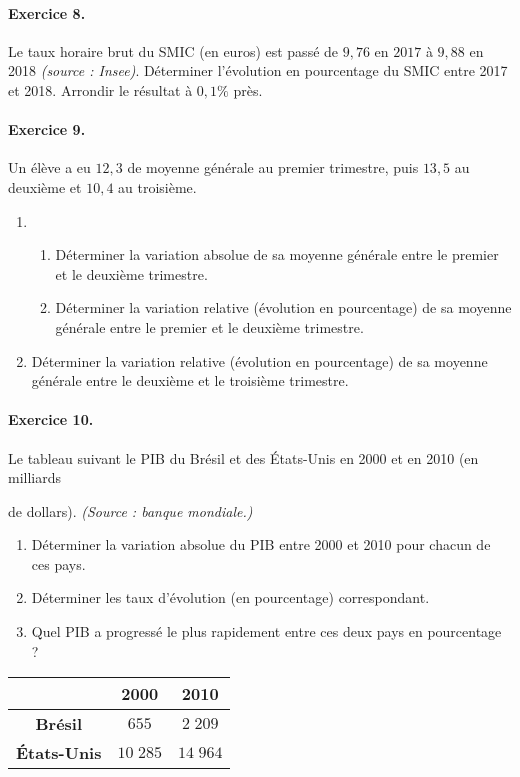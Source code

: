 \documentclass[11pt]{article}
\begin{document}
\paragraph{Exercice 8.}
Le taux horaire brut du SMIC (en euros) est passé de $9,76$ en $2017$ à $9,88$
en 2018 \emph{(source : Insee)}. Déterminer l'évolution en pourcentage du SMIC
entre 2017 et 2018. Arrondir le résultat à $0,1\%$ près.

\paragraph{Exercice 9.} Un élève a eu $12,3$ de moyenne générale au premier
trimestre, puis $13,5$ au deuxième et $10,4$ au troisième.
\begin{enumerate}
  \item \begin{enumerate}
      \item Déterminer la variation absolue de sa moyenne générale entre le
        premier et le deuxième trimestre.
      \item Déterminer la variation relative (évolution en pourcentage) de sa
        moyenne générale entre le premier et le deuxième trimestre.
    \end{enumerate}
      \item Déterminer la variation relative (évolution en pourcentage) de sa
        moyenne générale entre le deuxième et le troisième trimestre.
\end{enumerate}

\paragraph{Exercice 10.}
Le tableau suivant le PIB du Brésil et des États-Unis en 2000 et en 2010 (en
milliards\\
\begin{minipage}{.7\textwidth}
  de dollars). \emph{(Source : banque mondiale.)}
  \begin{enumerate}
    \item Déterminer la variation absolue du PIB entre 2000 et 2010 pour chacun
      de ces pays.
    \item Déterminer les taux d'évolution (en pourcentage) correspondant.
    \item Quel PIB a progressé le plus rapidement entre ces deux pays en
      pourcentage ?
  \end{enumerate}
\end{minipage}
\begin{minipage}{.3\textwidth}
  \begin{tabular}{ccc}
    \toprule
    & \textbf{2000} & \textbf{2010} \\
    \midrule
    \textbf{Brésil} & $ 655$ & $2\;209$ \\
    \textbf{États-Unis} & $10\;285$ & $14\;964$\\
    \bottomrule
  \end{tabular}
\end{minipage}
\end{document}
